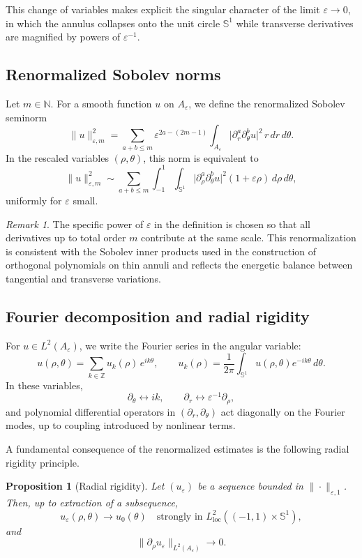 \documentclass[11pt]{amsart}
\theoremstyle{plain}
\newtheorem{proposition}[theorem]{Proposition}
\theoremstyle{definition}
\theoremstyle{remark}
\newtheorem{remark}[theorem]{Remark}
\theoremstyle{remark}
\begin{document}
This change of variables makes explicit the singular character of the limit
$\varepsilon\to0$, in which the annulus collapses onto the unit circle
$\mathbb S^1$ while transverse derivatives are magnified by powers of
$\varepsilon^{-1}$.

\subsection{Renormalized Sobolev norms}

Let $m\in\mathbb N$.
For a smooth function $u$ on $A_\varepsilon$, we define the renormalized Sobolev
seminorm
\[
\|u\|_{\varepsilon,m}^2
=
\sum_{a+b\le m}
\varepsilon^{2a-(2m-1)}
\int_{A_\varepsilon}
\bigl|\partial_r^a\partial_\theta^b u\bigr|^2
\,r\,dr\,d\theta.
\]
In the rescaled variables $(\rho,\theta)$, this norm is equivalent to
\[
\|u\|_{\varepsilon,m}^2
\sim
\sum_{a+b\le m}
\int_{-1}^1\!\!\int_{\mathbb S^1}
\bigl|\partial_\rho^a\partial_\theta^b u\bigr|^2
(1+\varepsilon\rho)\,d\rho\,d\theta,
\]
uniformly for $\varepsilon$ small.

\begin{remark}
The specific power of $\varepsilon$ in the definition is chosen so that
all derivatives up to total order $m$ contribute at the same scale.
This renormalization is consistent with the Sobolev inner products used
in the construction of orthogonal polynomials on thin annuli and reflects
the energetic balance between tangential and transverse variations.
\end{remark}

\subsection{Fourier decomposition and radial rigidity}

For $u\in L^2(A_\varepsilon)$, we write the Fourier series in the angular
variable:
\[
u(\rho,\theta)
=
\sum_{k\in\mathbb Z} u_k(\rho)\,e^{ik\theta},
\qquad
u_k(\rho)
=
\frac1{2\pi}\int_{\mathbb S^1} u(\rho,\theta)e^{-ik\theta}\,d\theta.
\]
In these variables,
\[
\partial_\theta \leftrightarrow ik,
\qquad
\partial_r \leftrightarrow \varepsilon^{-1}\partial_\rho,
\]
and polynomial differential operators in $(\partial_r,\partial_\theta)$
act diagonally on the Fourier modes, up to coupling introduced by nonlinear
terms.

A fundamental consequence of the renormalized estimates is the following
radial rigidity principle.

\begin{proposition}[Radial rigidity]
\label{prop:radial-rigidity}
Let $(u_\varepsilon)$ be a sequence bounded in $\|\cdot\|_{\varepsilon,1}$.
Then, up to extraction of a subsequence,
\[
u_\varepsilon(\rho,\theta)
\longrightarrow
u_0(\theta)
\quad\text{strongly in }L^2_{\mathrm{loc}}((-1,1)\times\mathbb S^1),
\]
and
\[
\|\partial_\rho u_\varepsilon\|_{L^2(A_\varepsilon)} \longrightarrow 0.
\]
\end{proposition}
\end{document}
